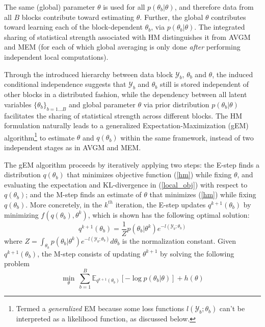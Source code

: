 \documentclass{article}
\newcommand{\1}[0]{\ensuremath{\boldsymbol{1}}\xspace}
\begin{document}
The same (global) parameter $\theta$ is used for all $p(\theta_b|\theta)$, and therefore data from all $B$ blocks contribute toward estimating $\theta$. Further, the global $\theta$ contributes toward learning each of the block-dependent $\theta_b$, via $p(\theta_b|\theta)$. The integrated sharing of statistical strength associated with HM distinguishes it from AVGM and MEM (for each of which global averaging is only done \emph{after} performing independent local computations).

Through the introduced hierarchy between data block $\mathcal{Y}_b$, $\theta_b$ and $\theta$, the induced conditional independence suggests that $\mathcal{Y}_b$ and $\theta_b$ still is stored independent of other blocks in a distributed fashion, while the dependency between all latent variables $\{\theta_b\}_{b=1\ldots B}$ and global parameter $\theta$ via prior distribution $p(\theta_b|\theta)$ facilitates the sharing of statistical strength across different blocks. The HM formulation naturally leads to a generalized Expectation-Maximization (gEM) algorithm\footnote{Termed a \emph{generalized} EM because some loss functions $l(\mathcal{Y}_b; \theta_b)$ can't be interpreted as a likelihood function, as discussed below.} to estimate $\theta$ and $q(\theta_b)$ within the same framework, instead of two independent stages as in AVGM and MEM.

The gEM algorithm proceeds by iteratively applying two steps: the E-step finds a distribution $q(\theta_b)$ that minimizes objective function (\ref{hm}) while fixing $\theta$, and evaluating the expectation and KL-divergence in (\ref{local_obj}) with respect to $q(\theta_b)$; and the M-step finds an estimate of $\theta$ that minimizes (\ref{hm}) while fixing $q(\theta_b)$. More concretely, in the $k^{th}$ iteration, the E-step updates $q^{k+1}(\theta_b)$ by minimizing $f(q(\theta_b), \theta^k)$, which is shown has the following optimal solution: 
\begin{equation}\label{hm_e_step_sol}
\textstyle q^{k+1}(\theta_b) = \frac{1}{Z}p(\theta_b|\theta^k)e^{-l(\mathcal{Y}_b; \theta_b)}
\end{equation}
where $Z = \int_{\theta_b}p(\theta_b|\theta^k)e^{-l(\mathcal{Y}_b; \theta_b)}d\theta_b$ is the normalization constant.  Given $q^{k+1}(\theta_b)$, the M-step consists of updating $\theta^{k+1}$ by solving the following problem
\begin{equation}\label{hm_m_step}
\textstyle\min_{\theta}~\sum_{b=1}^B\mathbb{E}_{q^{k+1}(\theta_b)}[-\log p(\theta_b|\theta)] + h(\theta)
\end{equation}
\end{document}
